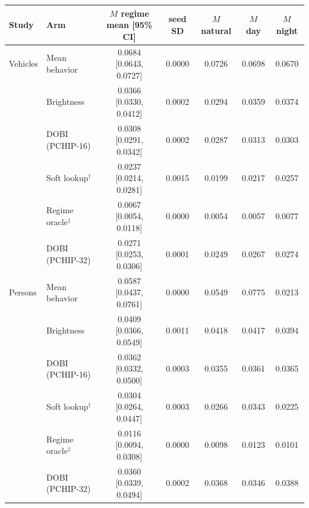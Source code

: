 \begin{tabular}{llccccc}
\toprule
Study & Arm & $M$ regime mean [95\% CI] & seed SD & $M$ natural & $M$ day & $M$ night \\
\midrule
Vehicles & Mean behavior & 0.0684 [0.0643, 0.0727] & 0.0000 & 0.0726 & 0.0698 & 0.0670 \\
 & Brightness & 0.0366 [0.0330, 0.0412] & 0.0002 & 0.0294 & 0.0359 & 0.0374 \\
 & DOBI (PCHIP-16) & 0.0308 [0.0291, 0.0342] & 0.0002 & 0.0287 & 0.0313 & 0.0303 \\
 & Soft lookup$^\dagger$ & 0.0237 [0.0214, 0.0281] & 0.0015 & 0.0199 & 0.0217 & 0.0257 \\
 & Regime oracle$^\ddagger$ & 0.0067 [0.0054, 0.0118] & 0.0000 & 0.0054 & 0.0057 & 0.0077 \\
 & DOBI (PCHIP-32) & 0.0271 [0.0253, 0.0306] & 0.0001 & 0.0249 & 0.0267 & 0.0274 \\
\midrule
Persons & Mean behavior & 0.0587 [0.0437, 0.0761] & 0.0000 & 0.0549 & 0.0775 & 0.0213 \\
 & Brightness & 0.0409 [0.0366, 0.0549] & 0.0011 & 0.0418 & 0.0417 & 0.0394 \\
 & DOBI (PCHIP-16) & 0.0362 [0.0332, 0.0500] & 0.0003 & 0.0355 & 0.0361 & 0.0365 \\
 & Soft lookup$^\dagger$ & 0.0304 [0.0264, 0.0447] & 0.0003 & 0.0266 & 0.0343 & 0.0225 \\
 & Regime oracle$^\ddagger$ & 0.0116 [0.0094, 0.0308] & 0.0000 & 0.0098 & 0.0123 & 0.0101 \\
 & DOBI (PCHIP-32) & 0.0360 [0.0339, 0.0494] & 0.0002 & 0.0368 & 0.0346 & 0.0388 \\
\bottomrule
\end{tabular}
